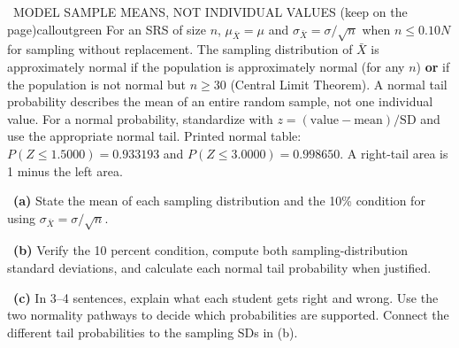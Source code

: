 \documentclass[11pt]{article}
\begin{document}
\begin{callout}{\IconBook\ MODEL SAMPLE MEANS, NOT INDIVIDUAL VALUES (keep on the page)}{calloutgreen}
For an SRS of size $n$, $\mu_{\bar X}=\mu$ and $\sigma_{\bar X}=\sigma/\sqrt n$ when
$n\leq0.10N$ for sampling without replacement. The sampling distribution of $\bar X$ is
approximately normal if the population is approximately normal (for any $n$)
\textbf{or} if the population is not normal but $n\geq30$ (Central Limit Theorem).
A normal tail probability describes the mean of an entire random sample, not one individual value.
For a normal probability, standardize with $z=(\text{value}-\text{mean})/\text{SD}$ and use the appropriate normal tail.
Printed normal table: $P(Z\leq1.5000)=0.933193$ and $P(Z\leq3.0000)=0.998650$. A right-tail area is 1 minus the left area.
\end{callout}

~\textbf{(a)} State the mean of each sampling distribution and the 10\% condition for using $\sigma_{\bar X}=\sigma/\sqrt n$.\par
{}

~\textbf{(b)} Verify the 10 percent condition, compute both sampling-distribution standard deviations, and calculate each normal tail probability when justified.\par
{}

~\textbf{(c)} In 3--4 sentences, explain what each student gets right and wrong. Use the two normality pathways to decide which probabilities are supported. Connect the different tail probabilities to the sampling SDs in (b).\par
{}
\end{document}
